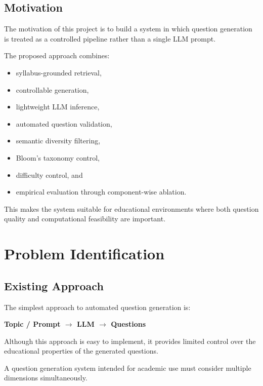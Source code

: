 \documentclass[12pt,a4paper]{report}
\begin{document}
\section{Motivation}

The motivation of this project is to build a system in which question generation is treated as a controlled pipeline rather than a single LLM prompt.

The proposed approach combines:

\begin{itemize}
    \item syllabus-grounded retrieval,
    \item controllable generation,
    \item lightweight LLM inference,
    \item automated question validation,
    \item semantic diversity filtering,
    \item Bloom's taxonomy control,
    \item difficulty control, and
    \item empirical evaluation through component-wise ablation.
\end{itemize}

This makes the system suitable for educational environments where both question quality and computational feasibility are important.


\chapter{Problem Identification}

\section{Existing Approach}

The simplest approach to automated question generation is:

\begin{center}
\textbf{Topic / Prompt $\rightarrow$ LLM $\rightarrow$ Questions}
\end{center}

Although this approach is easy to implement, it provides limited control over the educational properties of the generated questions.

A question generation system intended for academic use must consider multiple dimensions simultaneously.
\end{document}
